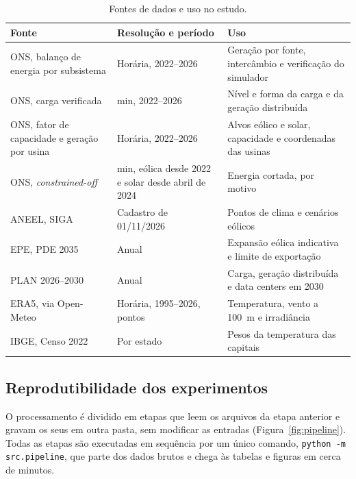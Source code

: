 \begin{table}[H]
\centering
\caption{Fontes de dados e uso no estudo.}
\label{tab:fontes}
\footnotesize
\renewcommand{\arraystretch}{1.2}
\setlength{\tabcolsep}{4pt}
\begin{tabularx}{\textwidth}{@{}>{\raggedright\arraybackslash}p{4.1cm}>{\raggedright\arraybackslash}p{3.5cm}>{\raggedright\arraybackslash}X@{}}
\toprule
Fonte & Resolução e período & Uso \\
\midrule
ONS, balanço de energia por subsistema \parencite{ons_dados} & Horária, 2022--2026 & Geração por fonte, intercâmbio e verificação do simulador \\
ONS, carga verificada & 30 min, 2022--2026 & Nível e forma da carga e da geração distribuída \\
ONS, fator de capacidade e geração por usina & Horária, 2022--2026 & Alvos eólico e solar, capacidade e coordenadas das usinas \\
ONS, \textit{constrained-off} & 30 min, eólica desde 2022 e solar desde abril de 2024 & Energia cortada, por motivo \\
ANEEL, SIGA \parencite{aneel_siga} & Cadastro de 01/11/2026 & Pontos de clima e cenários eólicos \\
EPE, PDE 2035 \parencite{epe_pde2035} & Anual & Expansão eólica indicativa e limite de exportação \\
PLAN 2026--2030 \parencite{plan_nt,plan_1rq,plan_2rq} & Anual & Carga, geração distribuída e data centers em 2030 \\
ERA5, via Open-Meteo & Horária, 1995--2026, \NPontosClima{} pontos & Temperatura, vento a 100~m e irradiância \\
IBGE, Censo 2022 \parencite{ibge_censo} & Por estado & Pesos da temperatura das capitais \\
\bottomrule
\end{tabularx}
\end{table}
\pagebreak

\subsection{Reprodutibilidade dos experimentos}
\label{sec:reprodutibilidade}

O processamento é dividido em etapas que leem os arquivos da etapa anterior e gravam os seus em outra pasta, sem modificar as entradas (Figura~\ref{fig:pipeline}). Todas as etapas são executadas em sequência por um único comando, \texttt{python -m src.pipeline}, que parte dos dados brutos e chega às tabelas e figuras em cerca de \TempoPipeline{} minutos.

